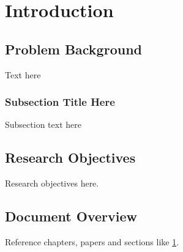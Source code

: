 \chapter{Introduction}
\label{ch:introduction}
\glsresetall

\section{Problem Background}

Text here

\subsection{Subsection Title Here}

Subsection text here


\section{Research Objectives}

Research objectives here.

\section{Document Overview}

Reference chapters, papers and sections like \cref{ch:introduction}.
